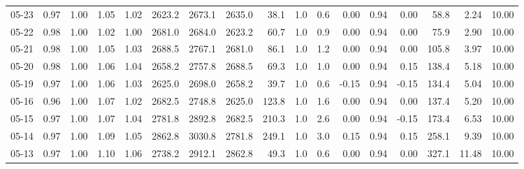 \begin{threeparttable}
{\begin{tabular}{lrrrrrrrrrrrrrrrr}
  05-23 &         0.97 &           1.00 &          1.05 &          1.02 & 2623.2 & 2673.1 & 2635.0 &       38.1 &                      1.0 &                 0.6 &       0.00 &      0.94 &           0.00 &             58.8 &            2.24 &                  10.00 \\
  05-22 &         0.98 &           1.00 &          1.02 &          1.00 & 2681.0 & 2684.0 & 2623.2 &       60.7 &                      1.0 &                 0.9 &       0.00 &      0.94 &           0.00 &             75.9 &            2.90 &                  10.00 \\
  05-21 &         0.98 &           1.00 &          1.05 &          1.03 & 2688.5 & 2767.1 & 2681.0 &       86.1 &                      1.0 &                 1.2 &       0.00 &      0.94 &           0.00 &            105.8 &            3.97 &                  10.00 \\
  05-20 &         0.98 &           1.00 &          1.06 &          1.04 & 2658.2 & 2757.8 & 2688.5 &       69.3 &                      1.0 &                 1.0 &       0.00 &      0.94 &           0.15 &            138.4 &            5.18 &                  10.00 \\
  05-19 &         0.97 &           1.00 &          1.06 &          1.03 & 2625.0 & 2698.0 & 2658.2 &       39.7 &                      1.0 &                 0.6 &      -0.15 &      0.94 &          -0.15 &            134.4 &            5.04 &                  10.00 \\
  05-16 &         0.96 &           1.00 &          1.07 &          1.02 & 2682.5 & 2748.8 & 2625.0 &      123.8 &                      1.0 &                 1.6 &       0.00 &      0.94 &           0.00 &            137.4 &            5.20 &                  10.00 \\
  05-15 &         0.97 &           1.00 &          1.07 &          1.04 & 2781.8 & 2892.8 & 2682.5 &      210.3 &                      1.0 &                 2.6 &       0.00 &      0.94 &          -0.15 &            173.4 &            6.53 &                  10.00 \\
  05-14 &         0.97 &           1.00 &          1.09 &          1.05 & 2862.8 & 3030.8 & 2781.8 &      249.1 &                      1.0 &                 3.0 &       0.15 &      0.94 &           0.15 &            258.1 &            9.39 &                  10.00 \\
  05-13 &         0.97 &           1.00 &          1.10 &          1.06 & 2738.2 & 2912.1 & 2862.8 &       49.3 &                      1.0 &                 0.6 &       0.00 &      0.94 &           0.00 &            327.1 &           11.48 &                  10.00 \\

\end{tabular}}
\end{threeparttable}

